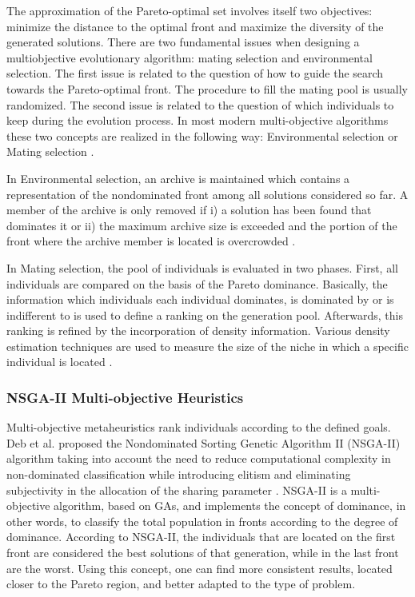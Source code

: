 \documentclass[espaco=umemeio,chapter=TITLE,twoside,openright]{abnt}
\begin{document}
The approximation of the Pareto-optimal set involves itself two objectives: minimize the distance to the optimal front and maximize the diversity of the generated solutions. There are two fundamental issues when designing a multiobjective evolutionary algorithm: mating selection and environmental selection. The first issue is related to the question of how to guide the search towards the Pareto-optimal front. The procedure to fill the mating pool is usually randomized. The second issue is related to the question of which individuals to keep during the evolution process. In most modern multi-objective algorithms these two concepts are realized in the following way: Environmental selection or Mating selection \cite{Zitzler2001}.

In  Environmental selection, an archive is maintained which contains a representation of the nondominated front among all solutions considered so far. A member of the archive is only removed if i) a solution has been found that dominates it or ii) the maximum archive size is exceeded and the portion of the front where the archive member is located is overcrowded \cite{Zitzler2001}.

In Mating selection, the pool of individuals is evaluated in two phases. First, all individuals are compared on the basis of the Pareto dominance. Basically, the information which individuals each individual dominates, is dominated by or is indifferent to is used to define a ranking on the generation pool. Afterwards, this ranking is refined by the incorporation of density information. Various density estimation techniques are used to measure the size of the niche in which a specific individual is located \cite{Zitzler2001}.


\subsubsection{NSGA-II Multi-objective Heuristics}

Multi-objective metaheuristics rank individuals according to the defined goals. Deb et al. proposed the Nondominated Sorting Genetic Algorithm II (NSGA-II) algorithm taking into account the need to reduce computational complexity in non-dominated classification while introducing elitism and eliminating subjectivity in the allocation of the sharing parameter \cite{Deb2000}. NSGA-II is a multi-objective algorithm, based on GAs, and implements the concept of dominance, in other words, to classify the total population in fronts according to the degree of dominance. According to NSGA-II, the individuals that are located on the first front are considered the best solutions of that generation, while in the last front are the worst. Using this concept, one can find more consistent results, located closer to the Pareto region, and better adapted to the type of problem.
\end{document}
